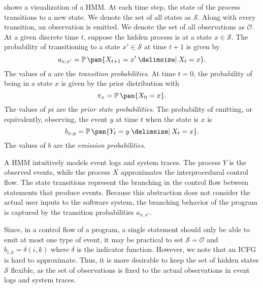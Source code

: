  shows a visualization of a HMM. At each time step, the state of the process transitions to a new state. We denote the set of all states as \(\mathcal{S}\). Along with every transition, an observation is emitted. We denote the set of all observations as \(\mathcal{O}\). At a given discrete time \(t\), suppose the hidden process is at a state \(x \in \mathcal{S}\). The probability of transitioning to a state \(x' \in \mathcal{S}\) at time \(t+1\) is given by
\begin{equation}\label{eq:transition}
    a_{x,x'} = \prob\pan{X_{t+1} = x' \giv X_t = x}.
\end{equation}
The values of \(a\) are the \emph{transition probabilities}. At time \(t = 0\), the probability of being in a state \(x\) is given by the prior distribution with
\begin{equation}\label{eq:prior}
    \pi_x = \prob\pan{X_0 = x}.
\end{equation}
The values of \(pi\) are the \emph{prior state probabilities}. The probability of emitting, or equivalently, observing, the event \(y\) at time \(t\) when the state is \(x\) is
\begin{equation}\label{eq:emission}
    b_{x,y} = \prob\pan{Y_t = y \giv X_t = x}.
\end{equation}
The values of \(b\) are the \emph{emission probabilities}.

A HMM intuitively models event logs and system traces. The process \(Y\) is the observed events, while the process \(X\) approximates the interprocedural control flow. The state transitions represent the branching in the control flow between statements that produce events. Because this abstraction does not consider the actual user inputs to the software system, the branching behavior of the program is captured by the transition probabilities \(a_{x,x'}\).

Since, in a control flow of a program, a single statement should only be able to emit at most one type of event, it may be practical to set \(\mathcal{S} = \mathcal{O}\) and \(b_{i,k} = \delta(i,k)\) where \(\delta\) is the indicator function. However, we note that an ICFG is hard to approximate. Thus, it is more desirable to keep the set of hidden states \(\mathcal{S}\) flexible, as the set of observations is fixed to the actual observations in event logs and system traces.

